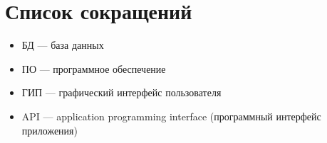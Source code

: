 \section*{Список сокращений}

\begin{itemize}[label={}]
    \item БД — база данных
    \item ПО — программное обеспечение
    \item ГИП — графический интерфейс пользователя
    \item API — application programming interface (программный интерфейс
            приложения)
\end{itemize}
